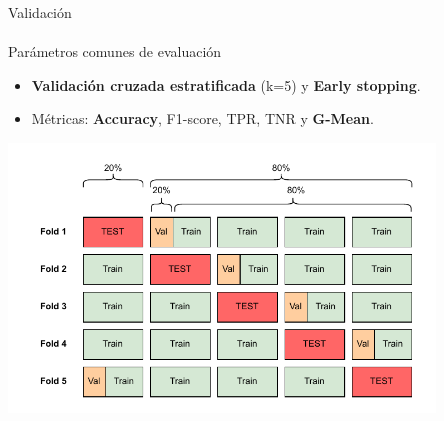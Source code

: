 \documentclass{beamer}
\begin{document}


\begin{frame}{Validación}
\framesubtitle{\insertsubsectionhead}

\begin{block}{Parámetros comunes de evaluación}
    \begin{itemize}
        \item \textbf{Validación cruzada estratificada} (k=5) y \textbf{Early stopping}.
        \item Métricas: \textbf{Accuracy}, F1-score, TPR, TNR y \textbf{G-Mean}.
    \end{itemize}
    
\end{block}

\centering
\includegraphics[width=0.85\textwidth]{img/cross_validate.drawio.pdf}

\end{frame}
\end{document}
